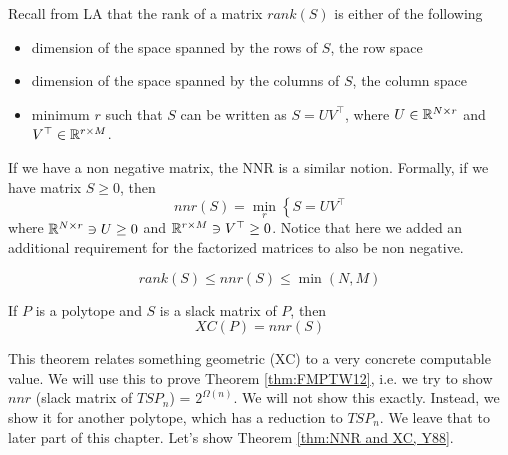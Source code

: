 \begin{definition}
	[Rank]
	Recall from LA that the rank of a matrix $rank(S)$ is either of the following
	\begin{itemize}
		\item dimension of the space spanned by the rows of $S$, the row space
		\item dimension of the space spanned by the columns of $S$, the column space
		\item minimum $r$ such that $S$ can be written as $S = UV^\top$, where $U \in \mathbb{R}^{N \times r}$ and $V^\top \in \mathbb{R}^{r \times M}$.   
	\end{itemize}
\end{definition}

\begin{definition}
	If we have a non negative matrix, the NNR is a similar notion. Formally, if we have matrix $S \geq 0$, then 
	\begin{equation}
		nnr(S) = \min_r \left\{
			S = U V^\top 
		\right.
	\end{equation}
	where $\mathbb{R}^{N \times r} \ni U \geq 0$ and $\mathbb{R}^{r \times M} \ni V^\top \geq 0$. Notice that here we added an additional requirement for the factorized matrices to also be non negative. 
\end{definition}

\begin{proposition}
	\begin{equation}
		rank(S) \leq nnr(S) \leq \min(N, M)
	\end{equation}
\end{proposition}

\begin{theorem}
	If $P$ is a polytope and $S$ is a slack matrix of $P$, then 
	\begin{equation}
		XC(P) = nnr(S)
	\end{equation}
	\label{thm:NNR and XC, Y88}
\end{theorem}
This theorem relates something geometric (XC) to a very concrete computable value. We will use this to prove Theorem \ref{thm:FMPTW12}, i.e. we try to show $nnr$ (slack matrix of $TSP_n$) = $2^{\Omega(n)}$. We will not show this exactly. Instead, we show it for another polytope, which has a reduction to $TSP_n$. We leave that to later part of this chapter. Let's show Theorem \ref{thm:NNR and XC, Y88}.
  
